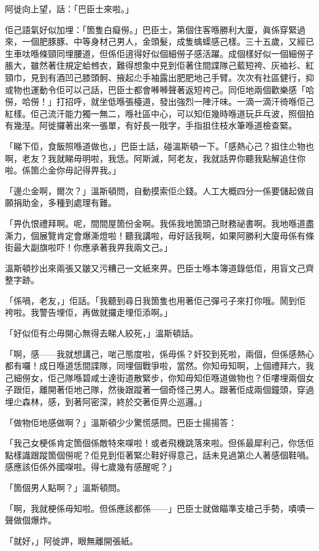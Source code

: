 阿徙向上望，話：「巴臣士來啦。」

佢己語氣好似加埋：「箇隻白癡僗。」巴臣士，第個住客喺勝利大廈，眞係穿緊過來，一個肥豚豚、中等身材己男人，金頭髮，成隻蠄蟝感己樣。三十五歲，又經已生車呔喺條頸同埋腰道，但係佢逳得好似個細僗子感活躍。成個樣好似一個細僗子脹大，雖然著住規定蛤乸衣，難得想𧰼中見到佢著住間諜隊己藍短袴、灰裇衫、紅頸巾，見到有酒凹己膝頭䯊、掖起尐手袖露出肥肥地己手臂。次次有社區健行，抑或物也運動令佢可以己話，巴臣士都會𠾴𠾴聲著返短袴己。同佢地兩個歡樂感「哈僗，哈僗！」打招呼，就坐低喺張檯道，發出強烈一陣汗味。一滴一滴汗徛喺佢己紅樣。佢己流汗能力獨一無二，喺社區中心，可以知佢幾時喺道玩乒乓波，照個拍有幾溼。阿徙攞著出來一張單，有好長一戙字，手指抯住枝水筆喺道檢查緊。

「睇下佢，食飯照喺道做也，」巴臣士話，碰溫斯頓一下。「感熱心己？抯住尐物也啊，老友？我就睇毋明啦，我恁。阿斯滅，阿老友，我就話畀你聽我點解追住你啦。係箇尐金你毋記得畀我。」

「邊尐金啊，爾次？」溫斯頓問，自動摸索佢尐錢。人工大概四分一係要儲起做自願捐助金，多種到處理有難。

「畀仇恨禮拜啊。呢，間間屋箇份金啊。我係我地箇頭己財務祕書啊。我地喺道盡澌力，個展覽肯定會爆澌燈啦！聽我講啦，毋好話我啊，如果阿勝利大廈毋係有條街最大副旗啦吓！你應承著我畀我兩文己。」

溫斯頓抄出來兩張又皺又污糟己一文紙來畀。巴臣士喺本簿道錄低佢，用盲文己齊整字跡。

「係喎，老友，」佢話。「我聽到尋日我箇隻也用著佢己彈弓子來打你哦。鬧到佢𠞉袴啦。我警告埋佢，再做就攞走埋佢添啊。」

「好似佢有尐毋開心無得去睇人絞死，」溫斯頓話。

「啊，感——我就想講己，啱己態度啦，係毋係？奸狡到死啦，兩個，但係感熱心都有囉！成日喺道恁間諜隊，同埋個戰爭啦，當然。你知毋知啊，上個禮拜六，我己細僗女，佢己隊喺碧咸士達街道散緊步，你知毋知佢喺道做物也？佢嘍埋兩個女子跟佢，離開著佢地己隊，然後跟蹤著一個奇怪己男人。跟著佢成兩個鐘頭，穿過埋尐森林，感，到著阿密深，終於交著佢畀尐巡邏。」

「做物佢地感做啊？」溫斯頓少少驚慌感問。巴臣士揚揚答：

「我己女梗係肯定箇個係敵特來㗎啦！或者飛機跳落來啦。但係最犀利己，你恁佢點樣識跟蹤箇個僗呢？佢見到佢著緊尐鞋好得意己，話未見過第尐人著感個鞋喎。感應該佢係外國㗎啦。得七歲幾有感醒呢？」

「箇個男人點啊？」溫斯頓問。

「啊，我就梗係毋知啦。但係應該都係——」巴臣士就做瞄準支槍己手勢，嘖嘖一聲做個爆炸。

「就好，」阿徙䛅，眼無離開張紙。

